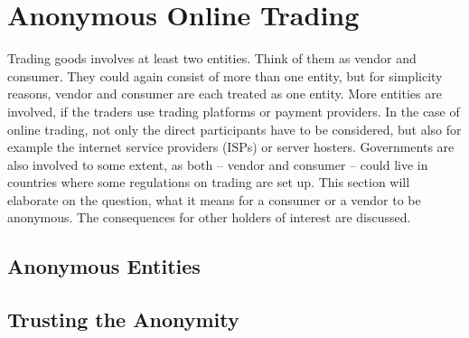 \section{Anonymous Online Trading}


Trading goods involves at least two entities. Think of them as vendor and consumer. They could again consist of more than one entity, but for simplicity reasons, vendor and consumer are each treated as one entity. More entities are involved, if the traders use trading platforms or payment providers. In the case of online trading, not only the direct participants have to be considered, but also for example the internet service providers (ISPs) or server hosters. Governments are also involved to some extent, as both -- vendor and consumer -- could live in countries where some regulations on trading are set up.
This section will elaborate on the question, what it means for a consumer or a vendor to be anonymous. The consequences for other holders of interest are discussed.

\subsection{Anonymous Entities}


\subsection{Trusting the Anonymity}



